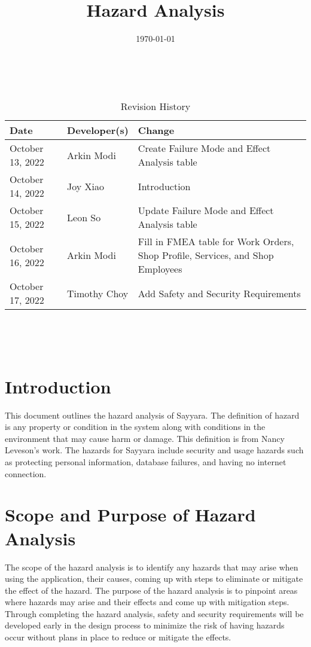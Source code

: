 \documentclass{article}
\title{Hazard Analysis\\\progname}
\author{\authname}
\date{\today}
\begin{document}
\maketitle
\thispagestyle{empty}

~\newpage


\begin{table}[hp]
	\caption{Revision History} \label{TblRevisionHistory}
	\begin{tabularx}{\textwidth}{llX}
		\toprule
		\textbf{Date}    & \textbf{Developer(s)} & \textbf{Change}                                                                \\
		\midrule
		October 13, 2022 & Arkin Modi            & Create Failure Mode and Effect Analysis table                                  \\
		October 14, 2022 & Joy Xiao              & Introduction                                                                   \\
		October 15, 2022 & Leon So               & Update Failure Mode and Effect Analysis table                                  \\
		October 16, 2022 & Arkin Modi            & Fill in FMEA table for Work Orders, Shop Profile, Services, and Shop Employees \\
		October 17, 2022 & Timothy Choy          & Add Safety and Security Requirements                                           \\
		\bottomrule
	\end{tabularx}
\end{table}

~\newpage

\tableofcontents

~\newpage


\section{Introduction}
This document outlines the hazard analysis of Sayyara. The definition of hazard is any property or
condition in the system along with conditions in the environment that may cause harm or damage.
This definition is from Nancy Leveson's work. The hazards for Sayyara include security and usage
hazards such as protecting personal information, database failures, and having no internet
connection.

\section{Scope and Purpose of Hazard Analysis}
The scope of the hazard analysis is to identify any hazards that may arise when using the
application, their causes, coming up with steps to eliminate or mitigate the effect of the hazard.
The purpose of the hazard analysis is to pinpoint areas where hazards may arise and their effects
and come up with mitigation steps. Through completing the hazard analysis, safety and security
requirements will be developed early in the design process to minimize the risk of having hazards
occur without plans in place to reduce or mitigate the effects.
\end{document}
